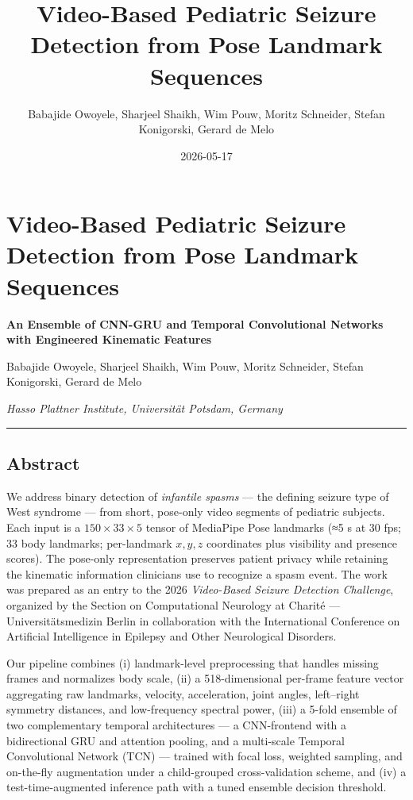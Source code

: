 \documentclass[
  11pt,
]{article}
\title{Video-Based Pediatric Seizure Detection from Pose Landmark
Sequences}
\author{Babajide Owoyele, Sharjeel Shaikh, Wim Pouw, Moritz Schneider,
Stefan Konigorski, Gerard de Melo}
\date{2026-05-17}
\begin{document}
\maketitle

\section{Video-Based Pediatric Seizure Detection from Pose Landmark
Sequences}\label{video-based-pediatric-seizure-detection-from-pose-landmark-sequences}

\textbf{An Ensemble of CNN-GRU and Temporal Convolutional Networks with
Engineered Kinematic Features}

Babajide Owoyele, Sharjeel Shaikh, Wim Pouw, Moritz Schneider, Stefan
Konigorski, Gerard de Melo

\emph{Hasso Plattner Institute, Universität Potsdam, Germany}

\begin{center}\rule{0.5\linewidth}{0.5pt}\end{center}

\subsection{Abstract}\label{abstract}

We address binary detection of \emph{infantile spasms} --- the defining
seizure type of West syndrome --- from short, pose-only video segments
of pediatric subjects. Each input is a \(150 \times 33 \times 5\) tensor
of MediaPipe Pose landmarks (≈5 s at 30 fps; 33 body landmarks;
per-landmark \(x,y,z\) coordinates plus visibility and presence scores).
The pose-only representation preserves patient privacy while retaining
the kinematic information clinicians use to recognize a spasm event. The
work was prepared as an entry to the 2026 \emph{Video-Based Seizure
Detection Challenge}, organized by the Section on Computational
Neurology at Charité --- Universitätsmedizin Berlin in collaboration
with the International Conference on Artificial Intelligence in Epilepsy
and Other Neurological Disorders.

Our pipeline combines (i) landmark-level preprocessing that handles
missing frames and normalizes body scale, (ii) a 518-dimensional
per-frame feature vector aggregating raw landmarks, velocity,
acceleration, joint angles, left--right symmetry distances, and
low-frequency spectral power, (iii) a 5-fold ensemble of two
complementary temporal architectures --- a CNN-frontend with a
bidirectional GRU and attention pooling, and a multi-scale Temporal
Convolutional Network (TCN) --- trained with focal loss, weighted
sampling, and on-the-fly augmentation under a child-grouped
cross-validation scheme, and (iv) a test-time-augmented inference path
with a tuned ensemble decision threshold.
\end{document}
